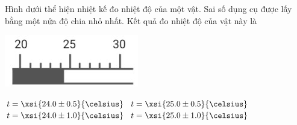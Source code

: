 \begin{ex}
Hình dưới thể hiện nhiệt kế đo nhiệt độ của một vật. Sai số dụng cụ được lấy bằng một nửa độ chia nhỏ nhất. Kết quả đo nhiệt độ của vật này là
\begin{center}
	\includegraphics[width=0.25\linewidth]{figs/VN12-Y24-PH-SYL-002P-3}
\end{center}
	\choice
	{\True $t=\xsi{24.0\pm0.5}{\celsius}$}
	{$t=\xsi{25.0\pm0.5}{\celsius}$}
	{$t=\xsi{24.0\pm1.0}{\celsius}$}
	{$t=\xsi{25.0\pm1.0}{\celsius}$}
	\loigiai{
		
	}
\end{ex}

